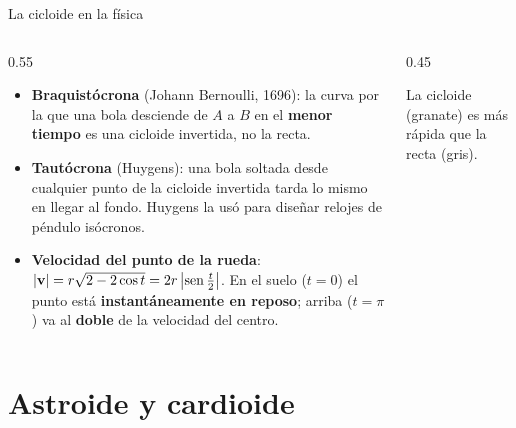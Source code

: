 \documentclass[10pt,aspectratio=169]{beamer}
\begin{document}
\begin{frame}{La cicloide en la física}
  \begin{columns}
    \begin{column}{0.55\textwidth}
      \begin{itemize}
        \item \textbf{Braquistócrona} (Johann Bernoulli, 1696): la curva por la que una bola desciende de $A$ a $B$ en el \textbf{menor tiempo}
          es una cicloide invertida, no la recta.
        \item \textbf{Tautócrona} (Huygens): una bola soltada desde cualquier punto de la cicloide invertida tarda lo mismo en llegar al fondo.
          Huygens la usó para diseñar relojes de péndulo isócronos.
        \item \textbf{Velocidad del punto de la rueda}: $|\mathbf v|=r\sqrt{2-2\cos t}=2r\left|\operatorname{sen}\frac t2\right|$.
          En el suelo ($t=0$) el punto está \textbf{instantáneamente en reposo}; arriba ($t=\pi$) va al \textbf{doble} de la velocidad del centro.
      \end{itemize}
    \end{column}
    \begin{column}{0.45\textwidth}
      \centering

      \small La cicloide (granate) es más rápida que la recta (gris).
    \end{column}
  \end{columns}
\end{frame}

\section{Astroide y cardioide}
\end{document}
